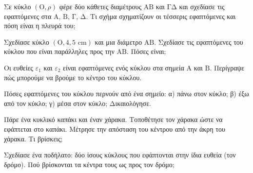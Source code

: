 
\ex Σε κύκλο $(\mathrm{Ο},\rho)$ φέρε δύο κάθετες διαμέτρους $\mathrm{ΑΒ}$ και $\mathrm{ΓΔ}$ και σχεδίασε τις εφαπτόμενες στα $\mathrm{Α}$, $\mathrm{Β}$, $\mathrm{Γ}$, $\mathrm{Δ}$. Τι σχήμα σχηματίζουν οι τέσσερις εφαπτόμενες και πόση είναι η πλευρά του;

\ex Σχεδίασε κύκλο $(\mathrm{Ο},4{,}5\text{ cm})$ και μια διάμετρο $\mathrm{ΑΒ}$. Σχεδίασε τις εφαπτόμενες του κύκλου που είναι παράλληλες προς την $\mathrm{ΑΒ}$. Πόσες είναι;

\ex Οι ευθείες $\varepsilon_1$ και $\varepsilon_2$ είναι εφαπτόμενες ενός κύκλου στα σημεία $\mathrm{Α}$ και $\mathrm{Β}$. Περίγραψε πώς μπορούμε να βρούμε το κέντρο του κύκλου.

\ex Πόσες εφαπτόμενες του κύκλου περνούν από ένα σημείο: α) πάνω στον κύκλο; β) έξω από τον κύκλο; γ) μέσα στον κύκλο; Δικαιολόγησε.


\ex Πάρε ένα κυκλικό καπάκι και έναν χάρακα. Τοποθέτησε τον χάρακα ώστε να εφάπτεται στο καπάκι. Μέτρησε την απόσταση του κέντρου από την άκρη του χάρακα. Τι βρίσκεις;

\ex Σχεδίασε ένα ποδήλατο: δύο ίσους κύκλους που εφάπτονται στην ίδια ευθεία (τον δρόμο). Πού βρίσκονται τα κέντρα τους ως προς τον δρόμο;
